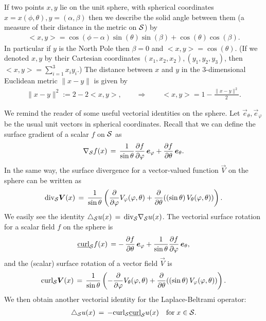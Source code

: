 If two points $x,y$ lie on the unit sphere, with
spherical coordinates $x=x(\phi,\theta), y=(\alpha,\beta)$ then we describe the solid angle between them (a measure of their distance in the metric on $\S$) by
\begin{align*}
  <x,y> =\cos(\phi-\alpha)\sin(\theta)\sin(\beta)+
    \cos(\theta)\cos(\beta).
\end{align*} 
In particular if $y$ is the North Pole then  $\beta=0$ and
$<x,y>=\cos(\theta)$. (If we denoted $x,y$  by their Cartesian
coordinates $(x_1,x_2,x_2),(y_1,y_2,y_3)$, then $<x,y> = \sum_{i=1}^3
x_iy_i$.) The distance between $x$ and $y$ in the 3-dimensional
Euclidean metric $\|x-y\|$ is given by 
\begin{align*}
  \|x-y\|^2 := 2-2<x,y>, \qquad \Rightarrow \qquad 
    <x,y>= 1-\frac{\|x-y\|^2}{2}.
\end{align*}

We remind the reader of some useful vectorial identities on the sphere.
Let $ \vec{e}_\theta, \vec{e}_{\varphi} $ be the usual unit vectors in
spherical coordinates.  Recall that we can define the surface gradient
of a scalar $f$ on $\S$ as
\begin{align*}
  \nabla_{\S} f(x) \,  = \, \frac{1}{\sin \theta}
  \frac{\partial f}{\partial \varphi} \,\vec{e}_{\varphi} + 
  \frac{\partial f}{\partial \theta}\, \vec{e}_{\theta}.
\end{align*}
In the same way, the surface divergence for a vector-valued
function $\vec{V}$ on the sphere can be written as
\begin{align*}
  \mbox{div}_{\S} \vec{V}(x) \, = \, 
  \frac{1}{\sin \theta} \left(
  \frac{\partial}{\partial \varphi}
  V_{\varphi}(\varphi,\theta) +
  \frac{\partial}{\partial \theta} ((\sin\theta) \, 
  V_{\theta}(\varphi,\theta) ) \right).
\end{align*}
We easily see the identity $\lap_{\S}u(x) \, = \,
\mbox{div}_{\S}\nabla_{\S} u(x)$.  The vectorial surface rotation for a
scalar field $f$ on the sphere is 
\begin{align*}
  \underline{\mbox{curl}}_{\S} f(x) \, = -\, 
  \frac{\partial f}{\partial \theta} \,\vec{e}_{\varphi} + 
  \frac{1}{\sin\theta}\frac{\partial f}{\partial \varphi}\, 
  \vec{e}_{\theta},
\end{align*}
and the (scalar) surface rotation of a vector field $\vec{V}$ is
\begin{align*}
  \mbox{curl}_{\S} \vec{V}(x) \, = \,
  \frac{1}{\sin \theta} \left(
  - \frac{\partial}{\partial \varphi} V_{\theta}(\varphi,\theta) +
  \frac{\partial}{\partial \theta} ((\sin \theta) \,   
  V_{\varphi}(\varphi,\theta)) \right).
\end{align*}
We then obtain another vectorial identity for the Laplace-Beltrami
operator:
\begin{align*}
  \lap_{\S} u(x) \, = \, - \mbox{curl}_{\S} 
  \underline{\mbox{curl}}_{\S} u(x) \quad \mbox{for} \; x \in {\S}.
\end{align*}


